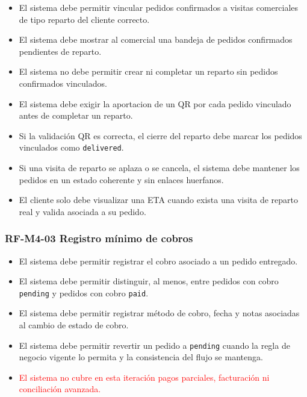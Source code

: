\begin{itemize}
    \item El sistema debe permitir vincular pedidos confirmados a visitas comerciales de tipo reparto del cliente correcto.
    \item El sistema debe mostrar al comercial una bandeja de pedidos confirmados pendientes de reparto.
    \item El sistema no debe permitir crear ni completar un reparto sin pedidos confirmados vinculados.
    \item El sistema debe exigir la aportacion de un QR por cada pedido vinculado antes de completar un reparto.
    \item Si la validación QR es correcta, el cierre del reparto debe marcar los pedidos vinculados como \texttt{delivered}.
    \item Si una visita de reparto se aplaza o se cancela, el sistema debe mantener los pedidos en un estado coherente y sin enlaces huerfanos.
    \item El cliente solo debe visualizar una ETA cuando exista una visita de reparto real y valida asociada a su pedido.
\end{itemize}

\vspace{-0.75em}
\subsubsection{RF-M4-03 Registro mínimo de cobros}
\vspace{-1em}

\begin{itemize}
    \item El sistema debe permitir registrar el cobro asociado a un pedido entregado.
    \item El sistema debe permitir distinguir, al menos, entre pedidos con cobro \texttt{pending} y pedidos con cobro \texttt{paid}.
    \item El sistema debe permitir registrar método de cobro, fecha y notas asociadas al cambio de estado de cobro.
    \item El sistema debe permitir revertir un pedido a \texttt{pending} cuando la regla de negocio vigente lo permita y la consistencia del flujo se mantenga.
    \item \textcolor{red}{El sistema no cubre en esta iteración pagos parciales, facturación ni conciliación avanzada.}
\end{itemize}

\vspace{-0.75em}
